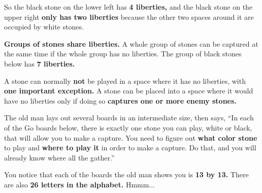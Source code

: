 So the black stone on the lower left has \textbf{4 liberties,} and the black
stone on the upper right \textbf{only has two liberties} because the other two
spaces around it are occupied by white stones.

\textbf{Groups of stones share liberties.} A whole group of stones can be
captured at the same time if the whole group has no liberties. The group of
black stones below has \textbf{7 liberties.}

\begin{center}
  \showgoban
\end{center}
\cleargoban
\cleargobansymbols

A stone can normally \textbf{not} be played in a space where it has no
liberties, with \textbf{one important exception.} A stone can be placed into a
space where it would have no liberties only if doing so \textbf{captures one or
  more enemy stones.}

The old man lays out several boards in an intermediate size, then says, ``In
each of the Go boards below, there is exactly one stone you can play, white or
black, that will allow you to make a capture. You need to figure out
\textbf{what color stone} to play and \textbf{where to play it} in order to make
a capture. Do that, and you will already know where all the \mappMobimon{}
gather.''

You notice that each of the boards the old man shows you is \textbf{13 by
  13.} There are also \textbf{26 letters in the alphabet.} Hmmm...


\begin{center}
  \showfullgoban
\end{center}

\cleargoban
{}
\begin{center}
  \showfullgoban
\end{center}

\cleargoban
{}
\begin{center}
  \showfullgoban
\end{center}

\cleargoban
{}
\begin{center}
  \showfullgoban
\end{center}

